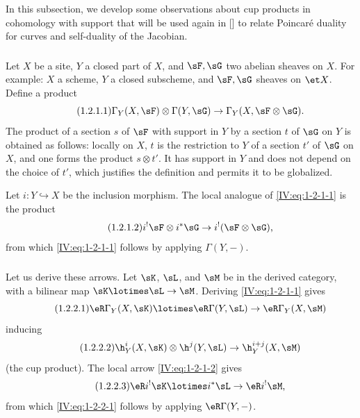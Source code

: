 \documentclass[oneside]{book}
\begin{document}
In this subsection, we develop some observations about cup products in
cohomology with support that will be used again in [] to relate
Poincaré duality for curves and self-duality of the Jacobian.

\subsubsection{}\label{IV:1-2-1}

Let $X$ be a site, $Y$ a closed part of $X$, and $\sF,\sG$ two abelian
sheaves on $X$. For example: $X$ a scheme, $Y$ a closed subscheme, and
$\sF,\sG$ sheaves on $\et X$. Define a product
\begin{equation*}\tag{1.2.1.1}\label{IV:eq:1-2-1-1}
  \Gamma_Y(X,\sF)\otimes \Gamma(Y,\sG) \to \Gamma_Y(X,\sF\otimes\sG) \text{.}
\end{equation*}
The product of a section $s$ of $\sF$ with support in $Y$ by a section $t$ of
$\sG$ on $Y$ is obtained as follows: locally on $X$, $t$ is the restriction
to $Y$ of a section $t'$ of $\sG$ on $X$, and one forms the product
$s\otimes t'$. It has support in $Y$ and does not depend on the choice of
$t'$, which justifies the definition and permits it to be globalized.

Let $i:Y\hookrightarrow X$ be the inclusion morphism. The local analogue of
\eqref{IV:eq:1-2-1-1} is the product
\begin{equation*}\tag{1.2.1.2}\label{IV:eq:1-2-1-2}
  i^!\sF\otimes i^*\sG \to i^!(\sF\otimes\sG) \text{,}
\end{equation*}
from which \eqref{IV:eq:1-2-1-1} follows by applying $\Gamma(Y,-)$.






\subsubsection{}\label{IV:1-2-2}

Let us derive these arrows. Let $\sK$, $\sL$, and $\sM$ be in the derived
category, with a bilinear map $\sK\lotimes\sL\to\sM$. Deriving
\eqref{IV:eq:1-2-1-1} gives
\begin{equation*}\tag{1.2.2.1}\label{IV:eq:1-2-2-1}
  \eR\Gamma_Y(X,\sK) \lotimes \eR\Gamma(Y,\sL) \to \eR\Gamma_Y(X,\sM)
\end{equation*}
inducing
\begin{equation*}\tag{1.2.2.2}\label{IV:eq:1-2-2-2}
  \h_Y^i(X,\sK)\otimes \h^j(Y,\sL) \to \h_Y^{i+j}(X,\sM)
\end{equation*}
(the cup product). The local arrow \eqref{IV:eq:1-2-1-2} gives
\begin{equation*}\tag{1.2.2.3}\label{IV:eq:1-2-2-3}
  \eR i^! \sK\lotimes i^*\sL \to \eR i^!\sM \text{,}
\end{equation*}
from which \eqref{IV:eq:1-2-2-1} follows by applying $\eR\Gamma(Y,-)$.
\end{document}
